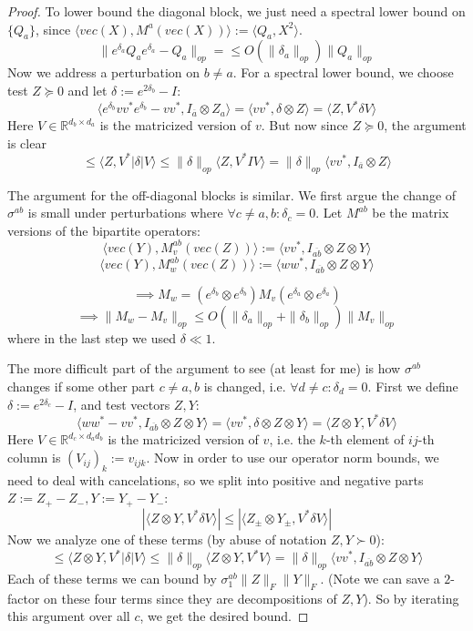 \documentclass{article}
\newcommand{\R}{{\mathbb{R}}}
\begin{document}
\begin{proof}
To lower bound the diagonal block, we just need a spectral lower bound on $\{Q_{a}\}$, since $\langle vec(X), M^{a} (vec(X)) \rangle := \langle Q_{a}, X^{2} \rangle$. 
\[ \| e^{\delta_{a}} Q_{a} e^{\delta_{a}} - Q_{a}\|_{op} = \leq O(\|\delta_{a}\|_{op}) \|Q_{a}\|_{op}   \]
Now we address a perturbation on $b \neq a$. For a spectral lower bound, we choose test $Z \succeq 0$ and let $\delta := e^{2\delta_{b}} - I$:
\[ \langle e^{\delta_{b}} v v^{*} e^{\delta_{b}} - v v^{*}, I_{\overline{a}} \otimes Z_{a} \rangle 
= \langle v v^{*}, \delta \otimes Z \rangle = \langle Z, V^{*} \delta V \rangle   \]
Here $V \in \R^{d_{b} \times d_{a}}$ is the matricized version of $v$. But now since $Z \succeq 0$, the argument is clear
\[ \leq \langle Z, V^{*} |\delta| V \rangle \leq \|\delta\|_{op} \langle Z, V^{*} I V \rangle = \|\delta\|_{op} \langle v v^{*}, I_{\overline{a}} \otimes Z \rangle     \]

The argument for the off-diagonal blocks is similar. We first argue the change of $\sigma^{ab}$ is small under perturbations where $\forall c \neq a,b: \delta_{c} = 0$. Let $M^{ab}$ be the matrix versions of the bipartite operators:
\[ \langle vec(Y), M_{v}^{ab}(vec(Z)) \rangle := \langle v v^{*}, I_{\overline{ab}} \otimes Z \otimes Y \rangle \] 
\[ \langle vec(Y), M_{w}^{ab}(vec(Z)) \rangle := \langle w w^{*}, I_{\overline{ab}} \otimes Z \otimes Y \rangle\]

\[ \implies M_{w} = (e^{\delta_{b}} \otimes e^{\delta_{b}}) M_{v} (e^{\delta_{a}} \otimes e^{\delta_{a}})   \]
\[ \implies \|M_{w} - M_{v}\|_{op} \leq O(\|\delta_{a}\|_{op} + \|\delta_{b}\|_{op}) \|M_{v}\|_{op}   \]
where in the last step we used $\delta \ll 1$. 

The more difficult part of the argument to see (at least for me) is how $\sigma^{ab}$ changes if some other part $c \neq a,b$ is changed, i.e. $\forall d \neq c: \delta_{d} = 0$. First we define $\delta := e^{2 \delta_{c}} - I$, and test vectors $Z,Y$:
\[ \langle w w^{*} - v v^{*}, I_{\overline{ab}} \otimes Z \otimes Y \rangle = \langle v v^{*}, \delta \otimes Z \otimes Y \rangle  = \langle Z \otimes Y, V^{*} \delta V \rangle \]
Here $V \in \R^{d_{c} \times d_{a}d_{b}}$ is the matricized version of $v$, i.e. the $k$-th element of $ij$-th column is $(V_{ij})_{k} := v_{ijk}$. Now in order to use our operator norm bounds, we need to deal with cancelations, so we split into positive and negative parts $Z := Z_{+} - Z_{-}, Y := Y_{+} - Y_{-}$:
\[ |\langle Z \otimes Y, V^{*} \delta V \rangle| \leq |\langle Z_{\pm} \otimes Y_{\pm}, V^{*} \delta V \rangle |  \]
Now we analyze one of these terms (by abuse of notation $Z, Y \succ 0$):
\[ \leq \langle Z \otimes Y, V^{*} |\delta| V \rangle \leq \|\delta\|_{op} \langle Z \otimes Y, V^{*} V \rangle = \|\delta\|_{op} \langle v v^{*}, I_{\overline{ab}} \otimes Z \otimes Y \rangle   \]
Each of these terms we can bound by $\sigma^{ab}_{1} \|Z\|_{F} \|Y\|_{F}$. (Note we can save a $2$-factor on these four terms since they are decompositions of $Z,Y$). So by iterating this argument over all $c$, we get the desired bound. 
\end{proof}
\end{document}
